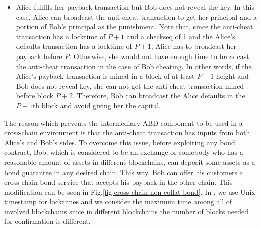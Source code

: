 \begin{itemize}
\begin{itemize}
        \item Alice fulfills her payback transaction but Bob does not reveal the \keyone key. In this case, Alice can broadcast the anti-cheat transaction to get her principal and a portion of Bob's principal as the punishment. Note that, since the anti-cheat transaction has a locktime of $P + 1$ and a checkseq of 1 and the Alice's defaults transaction has a locktime of $P + 1$, Alice has to broadcast her payback before $P$. Otherwise, she would not have enough time to broadcast the anti-cheat transaction in the case of Bob cheating. In other words, if the Alice's payback transaction is mined in a block of at least $P + 1$ height and Bob does not reveal \keyone key, she can not get the anti-cheat transaction mined before block $P + 2$. Therefore, Bob can broadcast the Alice defaults in the $P + 1$th block and avoid giving her the capital.
    \end{itemize}
\end{itemize}

The reason which prevents the intermediary ABD component to be used in a cross-chain environment is that
the anti-cheat transaction has inputs from both Alice's and Bob's sides. To overcome this issue, before exploiting any bond contract, Bob, which is considered to be an exchange or somebody who has a reasonable amount of assets in different blockchains, can deposit some assets as a bond guarantee in any desired chain. This way, Bob can offer his customers a cross-chain bond service that accepts his payback in the other chain. This modification can be seen in Fig.\ref{fig:cross-chain-non-collat-bond}. In \abcd, we use Unix timestamp for locktimes and we consider the maximum time among all of involved blockchains since in different blockchains the number of blocks needed for confirmation is different.


